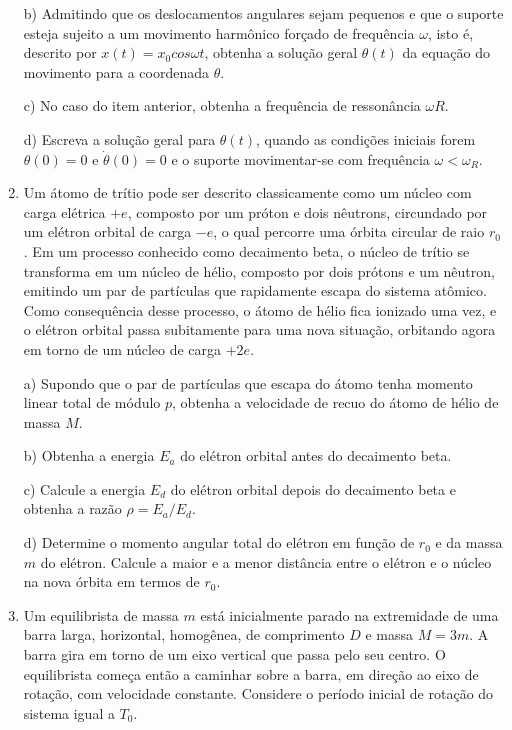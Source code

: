 \begin{enumerate}[start=1,label={\bfseries Q\arabic*.}]
\resposta

b) Admitindo que os deslocamentos angulares sejam pequenos e que o suporte esteja sujeito a um movimento harmônico forçado de frequência $\omega$, isto é, descrito por $x(t) = x_{0} cos \omega t$, obtenha a solução geral $\theta(t)$ da equação do movimento para a coordenada $\theta$.

\resposta

c) No caso do item anterior, obtenha a frequência de ressonância $\omega R$.

\resposta

d) Escreva a solução geral para $\theta(t)$, quando as condições iniciais forem $\theta(0) = 0$ e $\dot{\theta}(0) = 0$ e o suporte movimentar-se com frequência $\omega < \omega_{R}$.



\item Um átomo de trítio pode ser descrito classicamente como um núcleo com carga elétrica $+e$, composto por um próton e dois nêutrons, circundado por um elétron orbital de carga $-e$, o qual percorre uma órbita circular de raio $r_{0}$. Em um processo conhecido como decaimento beta, o núcleo de trítio se transforma em um núcleo de hélio, composto por dois prótons e um nêutron, emitindo um par de partículas que rapidamente escapa do sistema atômico. Como
consequência desse processo, o átomo de hélio fica ionizado uma vez, e o elétron orbital passa subitamente para uma nova situação, orbitando agora em torno de um núcleo de carga $+2e$.


a) Supondo que o par de partículas que escapa do átomo tenha momento linear total de módulo $p$, obtenha a velocidade de recuo do átomo de hélio de massa $M$.

\resposta

b) Obtenha a energia $E_{a}$ do elétron orbital antes do decaimento beta.

\resposta

c) Calcule a energia $E_{d}$ do elétron orbital depois do decaimento beta e obtenha a razão $\rho = E_{a}/E_{d}$.

\resposta

d) Determine o momento angular total do elétron em função de $r_{0}$ e da massa $m$ do elétron. Calcule a maior e a menor distância entre o elétron e o núcleo na nova órbita em termos de $r_{0}$.

\resposta


\item Um equilibrista de massa $m$ está inicialmente parado na extremidade de uma barra larga, horizontal, homogênea, de comprimento $D$ e massa $M = 3m$. A barra gira em torno de um eixo vertical que passa pelo seu centro. O equilibrista começa então a caminhar sobre a barra, em direção ao eixo de rotação, com velocidade constante. Considere o período inicial de rotação do sistema igual a $T_{0}$.


\end{enumerate}
